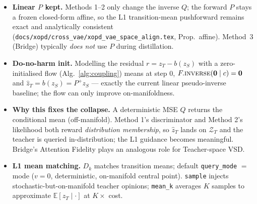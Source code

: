 \documentclass[11pt,a4paper]{article}
\newcommand{\E}{\mathbb{E}}
\newcommand{\Za}{\mathcal{Z}_{T}}
\newcommand{\zT}{z_{T}}
\newcommand{\zS}{z_{S}}
\begin{document}
\begin{itemize}[leftmargin=1.4em,itemsep=2pt]
  \item \textbf{Linear $P$ kept.} Methods 1--2 only change the inverse $Q$; the forward $P$
        stays a frozen closed-form affine, so the L1 transition-mean pushforward remains exact
        and analytically consistent (\texttt{docs/xopd/cross\_vae/xopd\_vae\_space\_align.tex}, Prop.~affine).
        Method~3 (Bridge) typically \emph{does not} use $P$ during distillation.
  \item \textbf{Do-no-harm init.} Modelling the residual $r=\zT-b(\zS)$ with a zero-initialised
        flow (Alg.~\ref{alg:coupling}) means at step $0$, $F.\textsc{inverse}(\mathbf{0}\mid c)=\mathbf{0}$
        and $\hat\zT=b(\zS)=P^{+}\zS$ --- exactly the current linear pseudo-inverse baseline; the
        flow can only improve on-manifoldness.
  \item \textbf{Why this fixes the collapse.} A deterministic MSE $Q$ returns the conditional
        mean (off-manifold). Method 1's discriminator and Method 2's likelihood both reward
        \emph{distribution membership}, so $\hat\zT$ lands on $\Za$ and the teacher is queried
        in-distribution; the L1 guidance becomes meaningful. Bridge's Attention Fidelity plays
        an analogous role for Teacher-space VSD.
  \item \textbf{L1 mean matching.} $D_k$ matches transition means; default \texttt{query\_mode}
        $=$ mode ($v{=}0$, deterministic, on-manifold central point). \texttt{sample} injects
        stochastic-but-on-manifold teacher opinions; \texttt{mean\_k} averages $K$ samples to
        approximate $\E[\zT\mid\cdot]$ at $K\times$ cost.
\end{itemize}
\end{document}
